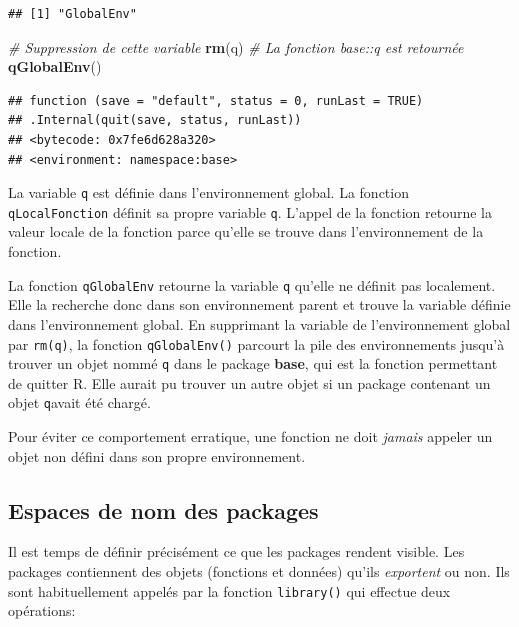 \documentclass[
  12pt,
  french,
  a4paper,
  extrafontsizes,onecolumn,openright
  ]{memoir}
\newenvironment{Shaded}{\begin{snugshade}}{\end{snugshade}}
\newcommand{\CommentTok}[1]{\textcolor[rgb]{0.56,0.35,0.01}{\textit{#1}}}
\newcommand{\KeywordTok}[1]{\textcolor[rgb]{0.13,0.29,0.53}{\textbf{#1}}}
\newcommand{\NormalTok}[1]{#1}
\begin{document}
\begin{verbatim}
## [1] "GlobalEnv"
\end{verbatim}

\begin{Shaded}
\begin{Highlighting}[]
\CommentTok{# Suppression de cette variable}
\KeywordTok{rm}\NormalTok{(q)}
\CommentTok{# La fonction base::q est retournée}
\KeywordTok{qGlobalEnv}\NormalTok{()}
\end{Highlighting}
\end{Shaded}

\begin{verbatim}
## function (save = "default", status = 0, runLast = TRUE) 
## .Internal(quit(save, status, runLast))
## <bytecode: 0x7fe6d628a320>
## <environment: namespace:base>
\end{verbatim}

\normalsize

La variable \texttt{q} est définie dans l'environnement global.
La fonction \texttt{qLocalFonction} définit sa propre variable \texttt{q}.
L'appel de la fonction retourne la valeur locale de la fonction parce qu'elle se trouve dans l'environnement de la fonction.

La fonction \texttt{qGlobalEnv} retourne la variable \texttt{q} qu'elle ne définit pas localement.
Elle la recherche donc dans son environnement parent et trouve la variable définie dans l'environnement global.
En supprimant la variable de l'environnement global par \texttt{rm(q)}, la fonction \texttt{qGlobalEnv()} parcourt la pile des environnements jusqu'à trouver un objet nommé \texttt{q} dans le package \textbf{base}, qui est la fonction permettant de quitter R.
Elle aurait pu trouver un autre objet si un package contenant un objet \texttt{q}avait été chargé.

Pour éviter ce comportement erratique, une fonction ne doit \emph{jamais} appeler un objet non défini dans son propre environnement.

\hypertarget{espaces-de-nom-des-packages}{%
\subsection{Espaces de nom des packages}\label{espaces-de-nom-des-packages}}

Il est temps de définir précisément ce que les packages rendent visible.
Les packages contiennent des objets (fonctions et données) qu'ils \emph{exportent} ou non.
Ils sont habituellement appelés par la fonction \texttt{library()} qui effectue deux opérations:
\end{document}
